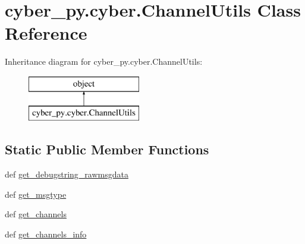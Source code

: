 \hypertarget{classcyber__py_1_1cyber_1_1ChannelUtils}{\section{cyber\-\_\-py.\-cyber.\-Channel\-Utils Class Reference}
\label{classcyber__py_1_1cyber_1_1ChannelUtils}
}
Inheritance diagram for cyber\-\_\-py.\-cyber.\-Channel\-Utils\-:\begin{figure}[H]
\begin{center}
\leavevmode
\includegraphics[height=2.000000cm]{classcyber__py_1_1cyber_1_1ChannelUtils}
\end{center}
\end{figure}
\subsection*{Static Public Member Functions}
\begin{DoxyCompactItemize}
\item 
def \hyperlink{classcyber__py_1_1cyber_1_1ChannelUtils_ac31f29d1c1054842d99d8a1020713911}{get\-\_\-debugstring\-\_\-rawmsgdata}
\item 
def \hyperlink{classcyber__py_1_1cyber_1_1ChannelUtils_a3e50e3eb9c4d0f1d911f32c08e4dcc37}{get\-\_\-msgtype}
\item 
def \hyperlink{classcyber__py_1_1cyber_1_1ChannelUtils_ae979f78f8c5d19313181ef5b8fcf700d}{get\-\_\-channels}
\item 
def \hyperlink{classcyber__py_1_1cyber_1_1ChannelUtils_a5046d189a66add18c5c365db80b09914}{get\-\_\-channels\-\_\-info}
\end{DoxyCompactItemize}


